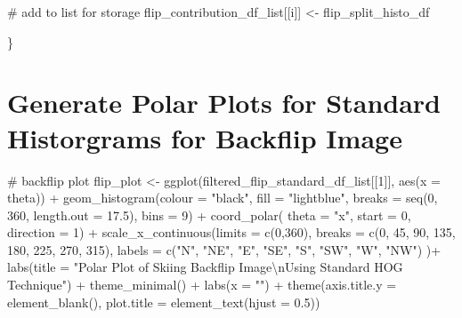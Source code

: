 \documentclass[
  letterpaper,
  DIV=11,
  numbers=noendperiod]{scrreprt}
\newenvironment{Shaded}{\begin{snugshade}}{\end{snugshade}}
\newcommand{\AttributeTok}[1]{\textcolor[rgb]{0.40,0.45,0.13}{#1}}
\newcommand{\CommentTok}[1]{\textcolor[rgb]{0.37,0.37,0.37}{#1}}
\newcommand{\DecValTok}[1]{\textcolor[rgb]{0.68,0.00,0.00}{#1}}
\newcommand{\FloatTok}[1]{\textcolor[rgb]{0.68,0.00,0.00}{#1}}
\newcommand{\FunctionTok}[1]{\textcolor[rgb]{0.28,0.35,0.67}{#1}}
\newcommand{\NormalTok}[1]{\textcolor[rgb]{0.00,0.23,0.31}{#1}}
\newcommand{\OtherTok}[1]{\textcolor[rgb]{0.00,0.23,0.31}{#1}}
\newcommand{\SpecialCharTok}[1]{\textcolor[rgb]{0.37,0.37,0.37}{#1}}
\newcommand{\StringTok}[1]{\textcolor[rgb]{0.13,0.47,0.30}{#1}}
\begin{document}
\begin{Shaded}
\begin{Highlighting}[]
  \CommentTok{\# add to list for storage}
\NormalTok{  flip\_contribution\_df\_list[[i]] }\OtherTok{\textless{}{-}}\NormalTok{ flip\_split\_histo\_df}

\NormalTok{\}}
\end{Highlighting}
\end{Shaded}

\section{Generate Polar Plots for Standard Historgrams for Backflip
Image}\label{generate-polar-plots-for-standard-historgrams-for-backflip-image}

\begin{Shaded}
\begin{Highlighting}[]
\CommentTok{\# backflip plot}
\NormalTok{flip\_plot }\OtherTok{\textless{}{-}}
  \FunctionTok{ggplot}\NormalTok{(filtered\_flip\_standard\_df\_list[[}\DecValTok{1}\NormalTok{]],}
         \FunctionTok{aes}\NormalTok{(}\AttributeTok{x =}\NormalTok{ theta)) }\SpecialCharTok{+}
  \FunctionTok{geom\_histogram}\NormalTok{(}\AttributeTok{colour =} \StringTok{"black"}\NormalTok{,}
                 \AttributeTok{fill =} \StringTok{"lightblue"}\NormalTok{,}
                 \AttributeTok{breaks =} \FunctionTok{seq}\NormalTok{(}\DecValTok{0}\NormalTok{, }\DecValTok{360}\NormalTok{, }\AttributeTok{length.out =} \FloatTok{17.5}\NormalTok{),}
                 \AttributeTok{bins =} \DecValTok{9}\NormalTok{) }\SpecialCharTok{+}
  \FunctionTok{coord\_polar}\NormalTok{(}
    \AttributeTok{theta =} \StringTok{"x"}\NormalTok{,}
    \AttributeTok{start =} \DecValTok{0}\NormalTok{,}
    \AttributeTok{direction =} \DecValTok{1}\NormalTok{) }\SpecialCharTok{+}
  \FunctionTok{scale\_x\_continuous}\NormalTok{(}\AttributeTok{limits =} \FunctionTok{c}\NormalTok{(}\DecValTok{0}\NormalTok{,}\DecValTok{360}\NormalTok{),}
    \AttributeTok{breaks =} \FunctionTok{c}\NormalTok{(}\DecValTok{0}\NormalTok{, }\DecValTok{45}\NormalTok{, }\DecValTok{90}\NormalTok{, }\DecValTok{135}\NormalTok{, }\DecValTok{180}\NormalTok{, }\DecValTok{225}\NormalTok{, }\DecValTok{270}\NormalTok{, }\DecValTok{315}\NormalTok{),}
    \AttributeTok{labels =} \FunctionTok{c}\NormalTok{(}\StringTok{"N"}\NormalTok{, }\StringTok{"NE"}\NormalTok{, }\StringTok{"E"}\NormalTok{, }\StringTok{"SE"}\NormalTok{, }\StringTok{"S"}\NormalTok{, }\StringTok{"SW"}\NormalTok{, }\StringTok{"W"}\NormalTok{, }\StringTok{"NW"}\NormalTok{)}
\NormalTok{  )}\SpecialCharTok{+}
  \FunctionTok{labs}\NormalTok{(}\AttributeTok{title =} \StringTok{"Polar Plot of Skiing Backflip Image}\SpecialCharTok{\textbackslash{}n}\StringTok{Using Standard HOG Technique"}\NormalTok{) }\SpecialCharTok{+}
  \FunctionTok{theme\_minimal}\NormalTok{() }\SpecialCharTok{+}
  \FunctionTok{labs}\NormalTok{(}\AttributeTok{x =} \StringTok{""}\NormalTok{) }\SpecialCharTok{+}
  \FunctionTok{theme}\NormalTok{(}\AttributeTok{axis.title.y =} \FunctionTok{element\_blank}\NormalTok{(),}
        \AttributeTok{plot.title =} \FunctionTok{element\_text}\NormalTok{(}\AttributeTok{hjust =} \FloatTok{0.5}\NormalTok{))}


\end{Highlighting}
\end{Shaded}
\end{document}
